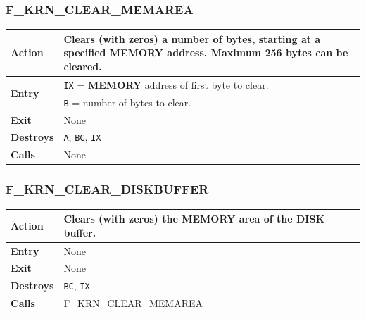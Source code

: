 \documentclass[a4paper,11pt]{article}
\begin{document}
        \subsubsection{F\_KRN\_CLEAR\_MEMAREA}
        \label{func:fkrnclearmemarea}
        \begin{tabular}{l p{9cm}}
            \hline\textbf{Action}
            & Clears (with zeros) a number of bytes, starting at a specified
            \textbf{MEMORY} address. Maximum 256 bytes can be cleared.\\
            \hline\multirow[t]{2}{4em}{\textbf{Entry}}
            & \texttt{IX} = \textbf{MEMORY} address of first byte to clear.\\
            & \texttt{B} = number of bytes to clear.\\
            \hline\textbf{Exit} & None\\
            \hline\textbf{Destroys} & \texttt{A}, \texttt{BC}, \texttt{IX}\\
            \hline\textbf{Calls} & None\\
            \hline
        \end{tabular}

        \subsubsection{F\_KRN\_CLEAR\_DISKBUFFER}
        \label{func:fkrncleardiskbuffer}
        \begin{tabular}{l p{9cm}}
            \hline\textbf{Action}
            & Clears (with zeros) the \textbf{MEMORY} area of the \textbf{DISK}
            buffer.\\
            \hline\textbf{Entry} & None\\
            \hline\textbf{Exit} & None\\
            \hline\textbf{Destroys} & \texttt{BC}, \texttt{IX}\\
            \hline\textbf{Calls} & \hyperref[func:fkrnclearmemarea]{F\_KRN\_CLEAR\_MEMAREA}\\
            \hline
        \end{tabular}

\end{document}
